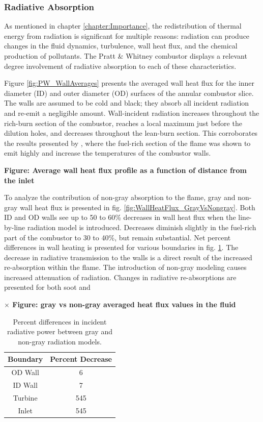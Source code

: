 \subsubsection{Radiative Absorption}
As mentioned in chapter \ref{chapter:Importance}, the redistribution of thermal energy from radiation is significant for multiple reasons: radiation can produce changes in the fluid dynamics, turbulence, wall heat flux, and the chemical production of pollutants.
The Pratt \& Whitney combustor displays a relevant degree involvement of radiative absorption to each of these characteristics.

Figure \ref{fig:PW_WallAverages} presents the averaged wall heat flux for the inner diameter (ID) and outer diameter (OD) surfaces of the annular combustor slice. 
The walls are assumed to be cold and black; they absorb all incident radiation and re-emit a negligible amount. 
Wall-incident radiation increases throughout the rich-burn section of the combustor, reaches a local maximum just before the dilution holes, and decreases throughout the lean-burn section.
This corroborates the results presented by \citet{Gamil2020AssessmentChamber}, where the fuel-rich section of the flame was shown to emit highly and increase the temperatures of the combustor walls.

\textbf{Figure: Average wall heat flux profile as a function of distance from the inlet}

To analyze the contribution of non-gray absorption to the flame, gray and non-gray wall heat flux is presented in fig. \ref{fig:WallHeatFlux_GrayVsNongray}.
Both ID and OD walls see up to 50 to 60\% decreases in wall heat flux when the line-by-line radiation model is introduced. Decreases diminish slightly in the fuel-rich part of the combustor to 30 to 40\%, but remain substantial.
Net percent differences in wall heating is presented for various boundaries in fig. \ref{table:PW_GrayVsNonGray}.
The decrease in radiative transmission to the walls is a direct result of the increased re-absorption within the flame. 
The introduction of non-gray modeling causes increased attenuation of radiation. Changes in radiative re-absorptions are presented for both soot and 


\textbf{$\times$ Figure: gray vs non-gray averaged heat flux values in the fluid}

\begin{table}[h!]
\centering
\begin{tabular}{||c c||} 
 \hline
 Boundary & Percent Decrease \\ [0.5ex] 
 \hline\hline
 OD Wall & 6 \\ 
 ID Wall & 7  \\
 Turbine & 545  \\
 Inlet & 545  \\ [1ex] 
 \hline
\end{tabular}
\caption{Percent differences in incident radiative power between gray and non-gray radiation models.}
\label{table:PW_GrayVsNonGray}
\end{table}

